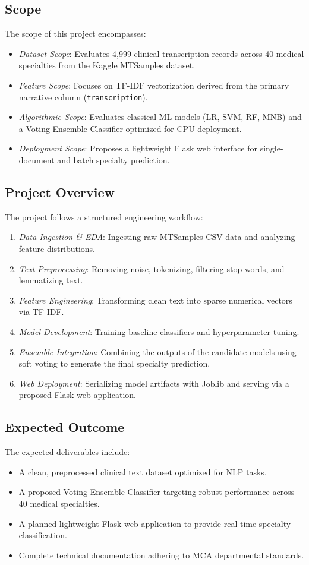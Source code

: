 \subsection{Scope}
The scope of this project encompasses:
\begin{itemize}
    \item \textit{Dataset Scope}: Evaluates 4,999 clinical transcription records across 40 medical specialties from the Kaggle MTSamples dataset.
    \item \textit{Feature Scope}: Focuses on TF-IDF vectorization derived from the primary narrative column (\texttt{transcription}).
    \item \textit{Algorithmic Scope}: Evaluates classical ML models (LR, SVM, RF, MNB) and a Voting Ensemble Classifier optimized for CPU deployment.
    \item \textit{Deployment Scope}: Proposes a lightweight Flask web interface for single-document and batch specialty prediction.
\end{itemize}

\subsection{Project Overview}
The project follows a structured engineering workflow:
\begin{enumerate}
    \item \textit{Data Ingestion \& EDA}: Ingesting raw MTSamples CSV data and analyzing feature distributions.
    \item \textit{Text Preprocessing}: Removing noise, tokenizing, filtering stop-words, and lemmatizing text.
    \item \textit{Feature Engineering}: Transforming clean text into sparse numerical vectors via TF-IDF.
    \item \textit{Model Development}: Training baseline classifiers and hyperparameter tuning.
    \item \textit{Ensemble Integration}: Combining the outputs of the candidate models using soft voting to generate the final specialty prediction.
    \item \textit{Web Deployment}: Serializing model artifacts with Joblib and serving via a proposed Flask web application.
\end{enumerate}

\subsection{Expected Outcome}
The expected deliverables include:
\begin{itemize}
    \item A clean, preprocessed clinical text dataset optimized for NLP tasks.
    \item A proposed Voting Ensemble Classifier targeting robust performance across 40 medical specialties.
    \item A planned lightweight Flask web application to provide real-time specialty classification.
    \item Complete technical documentation adhering to MCA departmental standards.
\end{itemize}
